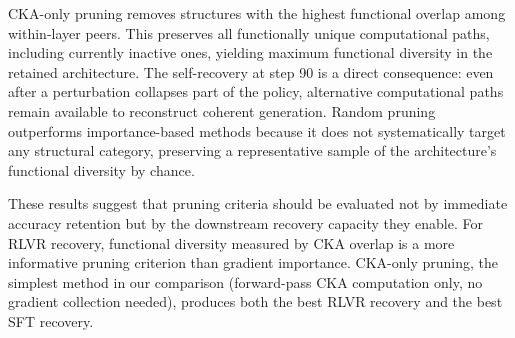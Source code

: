 CKA-only pruning removes structures with the highest functional overlap among within-layer peers.
This preserves all functionally unique computational paths, including currently inactive ones, yielding maximum functional diversity in the retained architecture.
The self-recovery at step 90 is a direct consequence: even after a perturbation collapses part of the policy, alternative computational paths remain available to reconstruct coherent generation.
Random pruning outperforms importance-based methods because it does not systematically target any structural category, preserving a representative sample of the architecture's functional diversity by chance.

These results suggest that pruning criteria should be evaluated not by immediate accuracy retention but by the downstream recovery capacity they enable.
For RLVR recovery, functional diversity measured by CKA overlap is a more informative pruning criterion than gradient importance.
CKA-only pruning, the simplest method in our comparison (forward-pass CKA computation only, no gradient collection needed), produces both the best RLVR recovery and the best SFT recovery.
